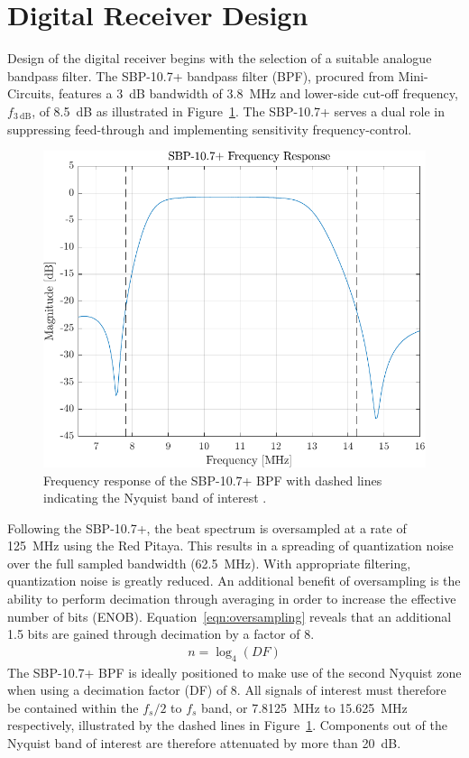 \documentclass[a4paper,11pt]{report}
\begin{document}
\section{Digital Receiver Design}
Design of the digital receiver begins with the selection of a suitable analogue bandpass filter. The SBP-10.7+ bandpass filter (BPF), procured from Mini-Circuits, features a \SI{3}{\dB} bandwidth of \SI{3.8}{MHz} and lower-side cut-off frequency, $ f_{\SI{3}{\dB}} $, of \SI{8.5}{\dB} as illustrated in Figure~\ref{fig:band_pass_response}. The SBP-10.7+ serves a dual role in suppressing feed-through and implementing sensitivity frequency-control. 
\begin{figure}[h!]
    \begin{center}
        \includegraphics[width=\textwidth]{images/band_pass_response}
        \caption{Frequency response of the SBP-10.7+ BPF with dashed lines indicating the Nyquist band of interest .}
        \label{fig:band_pass_response}
    \end{center}
\end{figure}

Following the SBP-10.7+, the beat spectrum is oversampled at a rate of \SI{125}{\MHz} using the Red Pitaya. This results in a spreading of quantization noise over the full sampled bandwidth (\SI{62.5}{\MHz}). With appropriate filtering, quantization noise is greatly reduced. An additional benefit of oversampling is the ability to perform decimation through averaging in order to increase the effective number of bits (ENOB). Equation~\ref{eqn:oversampling} reveals that an additional \SI{1.5}{} bits are gained through decimation by a factor of 8.
\begin{align} \label{eqn:oversampling}
n = \log_4 (DF)
\end{align}
The SBP-10.7+ BPF is ideally positioned to make use of the second Nyquist zone when using a decimation factor (DF) of 8. All signals of interest must therefore be contained within the $ f_{s}/2 $ to $ f_{s} $ band, or \SI{7.8125}{\MHz} to \SI{15.625}{\MHz} respectively, illustrated by the dashed lines in Figure~\ref{fig:band_pass_response}. Components out of the Nyquist band of interest are therefore attenuated by more than \SI{20}{\dB}. 
\end{document}
